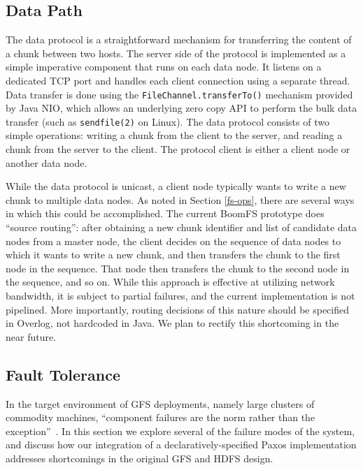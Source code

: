 \documentclass[twocolumn]{article}
\begin{document}
\subsection{Data Path}
The data protocol is a straightforward mechanism for transferring the
content of a chunk between two hosts. The server side of the protocol
is implemented as a simple imperative component that runs on each data
node. It listens on a dedicated TCP port and handles each client
connection using a separate thread. Data transfer is done using the
\texttt{FileChannel.transferTo()} mechanism provided by Java NIO,
which allows an underlying zero copy API to perform the bulk data
transfer (such as \texttt{sendfile(2)} on Linux). The data protocol
consists of two simple operations: writing a chunk from the client to
the server, and reading a chunk from the server to the client. The
protocol client is either a client node or another data node.

While the data protocol is unicast, a client node typically wants to
write a new chunk to multiple data nodes. As noted in Section
\ref{fs-ops}, there are several ways in which this could be
accomplished. The current BoomFS prototype does ``source routing'':
after obtaining a new chunk identifier and list of candidate data
nodes from a master node, the client decides on the sequence of data
nodes to which it wants to write a new chunk, and then transfers the
chunk to the first node in the sequence. That node then transfers the
chunk to the second node in the sequence, and so on. While this
approach is effective at utilizing network bandwidth, it is subject to
partial failures, and the current implementation is not
pipelined. More importantly, routing decisions of this nature should
be specified in Overlog, not hardcoded in Java. We plan to rectify
this shortcoming in the near future.

\subsection{Fault Tolerance}
In the target environment of GFS deployments, namely large clusters of
commodity machines, ``component failures are the norm rather than the
exception''~\cite{gfs}.  In this section we explore several of the
failure modes of the system, and discuss how our integration of a
declaratively-specified Paxos implementation addresses shortcomings in
the original GFS and HDFS design.
\end{document}
